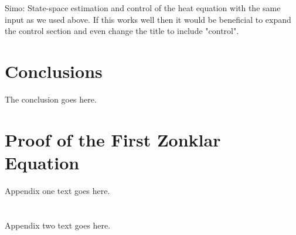 \documentclass[journal]{IEEEtran}
\newcommand{\simo}[1]{{\color{red}#1}}
\begin{document}
\simo{Simo: State-space estimation and control of the heat equation with the same input as we used above. If this works well then it would be beneficial to expand the control section and even change the title to include "control".}




\section{Conclusions}
The conclusion goes here.


%


\appendices
\section{Proof of the First Zonklar Equation}
Appendix one text goes here.

\section{}
Appendix two text goes here.
\end{document}
